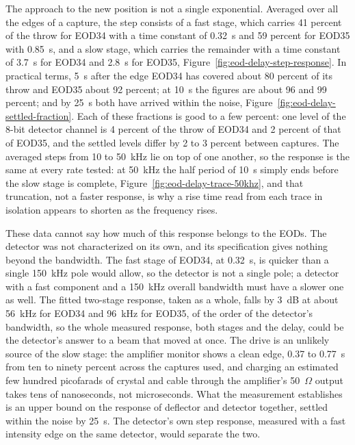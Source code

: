 \documentclass{article}
\begin{document}
The approach to the new position is not a single exponential. Averaged over all the edges of a
capture, the step consists of a fast stage, which carries 41 percent of the throw for EOD34 with a
time constant of 0.32~\textmu s and 59 percent for EOD35 with 0.85~\textmu s, and a slow stage,
which carries the remainder with a time constant of 3.7~\textmu s for EOD34 and 2.8~\textmu s for
EOD35, Figure~\ref{fig:eod-delay-step-response}. In practical terms, 5~\textmu s after the edge
EOD34 has covered about 80 percent of its throw and EOD35 about 92 percent; at 10~\textmu s the
figures are about 96 and 99 percent; and by 25~\textmu s both have arrived within the noise,
Figure~\ref{fig:eod-delay-settled-fraction}. Each of these fractions is good to a few percent: one
level of the 8-bit detector channel is 4 percent of the throw of EOD34 and 2 percent of that of
EOD35, and the settled levels differ by 2 to 3 percent between captures. The averaged steps from 10 to 50~kHz lie on top of one
another, so the response is the same at every rate tested: at 50~kHz the half period of
10~\textmu s simply ends before the slow stage is complete, Figure~\ref{fig:eod-delay-trace-50khz},
and that truncation, not a faster response, is why a rise time read from each trace in isolation
appears to shorten as the frequency rises.

These data cannot say how much of this response belongs to the EODs. The detector was not
characterized on its own, and its specification gives nothing beyond the bandwidth. The fast
stage of EOD34, at 0.32~\textmu s, is quicker than a single 150~kHz pole would allow, so the
detector is not a single pole; a detector with a fast component and a 150~kHz overall bandwidth
must have a slower one as well. The fitted two-stage response, taken as a whole, falls by 3~dB at
about 56~kHz for EOD34 and 96~kHz for EOD35, of the order of the detector's bandwidth, so the whole
measured response, both stages and the delay, could be the detector's answer to a beam that moved
at once. The drive is an unlikely source of the slow stage: the amplifier monitor shows a clean
edge, 0.37 to 0.77~\textmu s from ten to ninety percent across the captures used, and charging an
estimated few hundred picofarads of crystal and cable through the amplifier's 50~$\Omega$ output
takes tens of nanoseconds, not microseconds. What the measurement establishes is an upper bound on
the response of deflector and detector together, settled within the noise by 25~\textmu s. The
detector's own step response, measured with a fast intensity edge on the same detector, would
separate the two.
\end{document}
